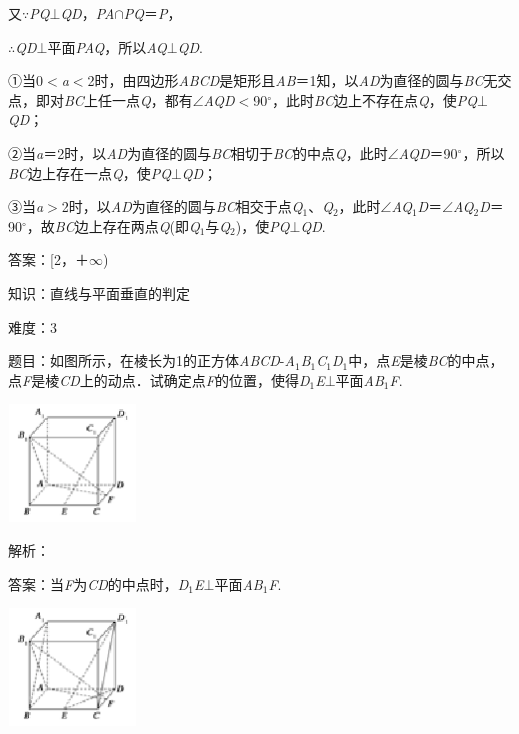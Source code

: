 \documentclass{article} %
\begin{document}
又$\mathrm{\because}$\textit{PQ}$\mathrm{\bot}$\textit{QD}，\textit{PA}$\mathrm{\cap}$\textit{PQ}＝\textit{P}，

$\mathrm{\therefore}$\textit{QD}$\mathrm{\bot}$平面\textit{PAQ}，所以\textit{AQ}$\mathrm{\bot}$\textit{QD}.

①当0$\mathrm{<}$\textit{a}$\mathrm{<}$2时，由四边形\textit{ABCD}是矩形且\textit{AB}＝1知，以\textit{AD}为直径的圆与\textit{BC}无交点，即对\textit{BC}上任一点\textit{Q}，都有$\mathrm{\angle}$\textit{AQD}$\mathrm{<}$90$\mathrm{{}^\circ}$，此时\textit{BC}边上不存在点\textit{Q}，使\textit{PQ}$\mathrm{\bot}$\textit{QD}；

②当\textit{a}＝2时，以\textit{AD}为直径的圆与\textit{BC}相切于\textit{BC}的中点\textit{Q}，此时$\mathrm{\angle}$\textit{AQD}＝90$\mathrm{{}^\circ}$，所以\textit{BC}边上存在一点\textit{Q}，使\textit{PQ}$\mathrm{\bot}$\textit{QD}；

③当\textit{a}$\mathrm{>}$2时，以\textit{AD}为直径的圆与\textit{BC}相交于点\textit{Q}${}_{1}$、\textit{Q}${}_{2}$，此时$\mathrm{\angle}$\textit{AQ}${}_{1}$\textit{D}＝$\mathrm{\angle}$\textit{AQ}${}_{2}$\textit{D}＝90$\mathrm{{}^\circ}$，故\textit{BC}边上存在两点\textit{Q}(即\textit{Q}${}_{1}$与\textit{Q}${}_{2}$)，使\textit{PQ}$\mathrm{\bot}$\textit{QD}.

答案：[2，＋$\mathrm{\infty}$)

知识：直线与平面垂直的判定

难度：3

题目：如图所示，在棱长为1的正方体\textit{ABCD}-\textit{A}${}_{1}$\textit{B}${}_{1}$\textit{C}${}_{1}$\textit{D}${}_{1}$中，点\textit{E}是棱\textit{BC}的中点，点\textit{F}是棱\textit{CD}上的动点．试确定点\textit{F}的位置，使得\textit{D}${}_{1}$\textit{E}$\mathrm{\bot}$平面\textit{AB}${}_{1}$\textit{F}.

\includegraphics*[width=1.34in, height=1.23in, keepaspectratio=false]{image205}

解析：

答案：当\textit{F}为\textit{CD}的中点时，\textit{D}${}_{1}$\textit{E}$\mathrm{\bot}$平面\textit{AB}${}_{1}$\textit{F}.

\includegraphics*[width=1.34in, height=1.23in, keepaspectratio=false]{image206}
\end{document}
